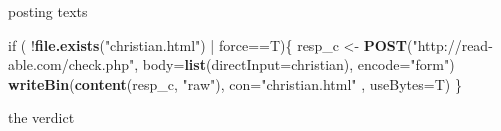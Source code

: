 \documentclass[ignorenonframetext,]{beamer}
\newenvironment{Shaded}{\begin{snugshade}}{\end{snugshade}}
\newcommand{\KeywordTok}[1]{\textcolor[rgb]{0.13,0.29,0.53}{\textbf{{#1}}}}
\newcommand{\DataTypeTok}[1]{\textcolor[rgb]{0.13,0.29,0.53}{{#1}}}
\newcommand{\DecValTok}[1]{\textcolor[rgb]{0.00,0.00,0.81}{{#1}}}
\newcommand{\StringTok}[1]{\textcolor[rgb]{0.31,0.60,0.02}{{#1}}}
\newcommand{\NormalTok}[1]{{#1}}
\begin{document}
\begin{frame}[fragile]{posting texts}

\begin{Shaded}
\begin{Highlighting}[]
\NormalTok{if ( !}\KeywordTok{file.exists}\NormalTok{(}\StringTok{"christian.html"}\NormalTok{)  |}\StringTok{ }\NormalTok{force==T)\{}
  \NormalTok{resp_c <-}\StringTok{ }\KeywordTok{POST}\NormalTok{(}\StringTok{"http://read-able.com/check.php"}\NormalTok{,}
            \DataTypeTok{body=}\KeywordTok{list}\NormalTok{(}\DataTypeTok{directInput=}\NormalTok{christian), }
            \DataTypeTok{encode=}\StringTok{"form"}\NormalTok{)}
  \KeywordTok{writeBin}\NormalTok{(}\KeywordTok{content}\NormalTok{(resp_c, }\StringTok{"raw"}\NormalTok{), }
           \DataTypeTok{con=}\StringTok{"christian.html"} \NormalTok{, }\DataTypeTok{useBytes=}\NormalTok{T)}
\NormalTok{\}}
\end{Highlighting}
\end{Shaded}

\end{frame}

\begin{frame}[fragile]{the verdict}

\begin{Shaded}
\end{Shaded}

\end{frame}
\end{document}
